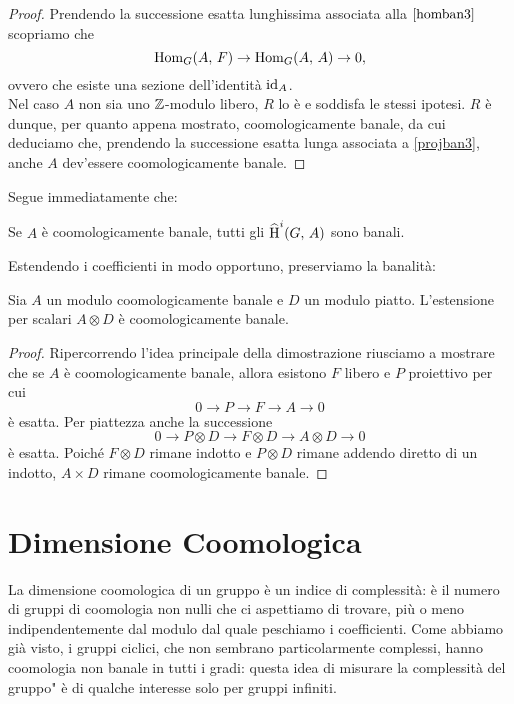 \begin{proof}
	Prendendo la successione esatta lunghissima associata alla $ \ref{homban3} $ scopriamo che
	\[ \operatorname{Hom}_G(A, \, F) \to \operatorname{Hom}_G(A, \, A) \to 0, \]
	ovvero che esiste una sezione dell'identità $ \operatorname{id}_A $.\\
	
	Nel caso $ A $ non sia uno $ \mathbb{Z} $-modulo libero, $ R $ lo è e soddisfa le stessi ipotesi. $ R $ è dunque, per quanto appena mostrato, coomologicamente banale, da cui deduciamo che, prendendo la successione esatta lunga associata a \ref{projban3}, anche $ A $ dev'essere coomologicamente banale.
	
\end{proof}

Segue immediatamente che:

\begin{corollary}
	Se $ A $ è coomologicamente banale, tutti gli $ \operatorname{\widehat{H}}^i(G, \, A) $ sono banali.
\end{corollary}

Estendendo i coefficienti in modo opportuno, preserviamo la banalità:

\begin{corollary}\label{tensor magic}
	Sia $ A $ un modulo coomologicamente banale e $ D $ un modulo piatto. L'estensione per scalari $ A \otimes D $ è coomologicamente banale.
\end{corollary}
\begin{proof}
	Ripercorrendo l'idea principale della dimostrazione riusciamo a mostrare che se $ A $ è coomologicamente banale, allora esistono $ F $ libero e $ P $ proiettivo per cui
	\[ 0 \to P \to F \to A \to 0 \]
	è esatta. Per piattezza anche la successione
	\[ 0 \to P \otimes D \to F\otimes D \to A\otimes D \to 0 \]
	è esatta. Poiché $ F \otimes D $ rimane indotto e $ P \otimes D $ rimane addendo diretto di un indotto, $ A \times D $ rimane coomologicamente banale.
\end{proof}

\section{Dimensione Coomologica}
La dimensione coomologica di un gruppo è un indice di complessità: è il numero di gruppi di coomologia non nulli che ci aspettiamo di trovare, più o meno indipendentemente dal modulo dal quale peschiamo i coefficienti. Come abbiamo già visto, i gruppi ciclici, che non sembrano particolarmente complessi, hanno coomologia non banale in tutti i gradi: questa idea di \leftquote misurare la complessità del gruppo" è di qualche interesse solo per gruppi infiniti.

